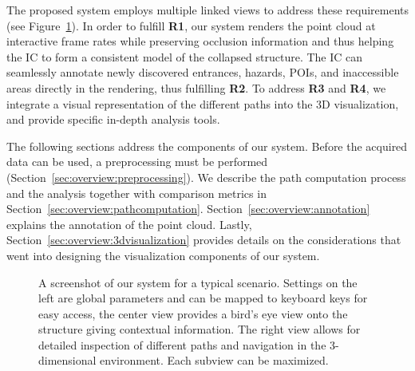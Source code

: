 \documentclass{egpubl}
\begin{document}
The proposed system employs multiple linked views to address these requirements (see Figure~\ref{sec:overview:system}). In order to fulfill {\bfseries R1}, our system renders the point cloud at interactive frame rates while preserving occlusion information and thus helping the IC to form a consistent model of the collapsed structure. The IC can seamlessly annotate newly discovered entrances, hazards, POIs, and inaccessible areas directly in the rendering, thus fulfilling {\bfseries R2}. To address {\bfseries R3} and {\bfseries R4}, we integrate a visual representation of the different paths into the 3D visualization, and provide specific in-depth analysis tools.

The following sections address the components of our system. Before the acquired data can be used, a preprocessing must be performed (Section~\ref{sec:overview:preprocessing}). We describe the path computation process and the analysis together with comparison metrics in Section~\ref{sec:overview:pathcomputation}. Section~\ref{sec:overview:annotation} explains the annotation of the point cloud. Lastly, Section~\ref{sec:overview:3dvisualization} provides details on the considerations that went into designing the visualization components of our system.

\begin{figure}
	\newcommand{\abSystemScreenshotWidth}{\columnwidth}
    \centering
    \caption{A screenshot of our system for a typical scenario. Settings on the left are global parameters and can be mapped to keyboard keys for easy access, the center view provides a bird's eye view onto the structure giving contextual information. The right view allows for detailed inspection of  different paths and navigation in the 3-dimensional environment. Each subview can be maximized.}
    \label{sec:overview:system}
\end{figure}
\end{document}
